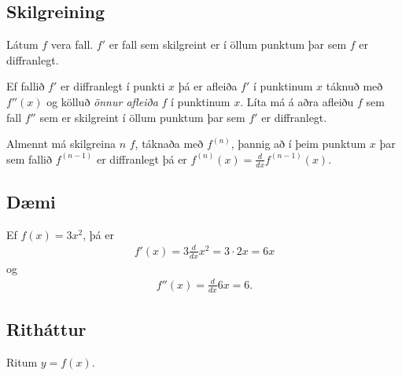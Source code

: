 \documentclass[a4paper,10pt,icelandic]{sphinxmanual}
\begin{document}
\subsection{Skilgreining}
\label{\detokenize{kafli03:skilgreining}}
Látum \(f\) vera fall.  \(f'\) er fall sem skilgreint er
í öllum punktum þar sem \(f\) er diffranlegt.

Ef fallið \(f'\) er diffranlegt í punkti \(x\) þá er afleiða
\(f'\) í punktinum \(x\) táknuð með \(f''(x)\) og kölluð
\textit{önnur afleiða} \(f\) í punktinum \(x\). Líta má á aðra afleiðu
\(f\) sem fall \(f''\) sem er skilgreint í öllum punktum þar sem
\(f'\) er diffranlegt.

Almennt má skilgreina \(n\) \(f\), táknaða með
\(f^{(n)}\), þannig að í þeim punktum \(x\) þar sem fallið
\(f^{(n-1)}\) er diffranlegt þá er
\(f^{(n)}(x)=\frac{d}{dx}f^{(n-1)}(x)\).


\subsection{Dæmi}
\label{\detokenize{kafli03:id8}}
Ef \(f(x)  = 3x^2\), þá er
\begin{equation*}
\begin{split}f'(x) = 3\frac{d}{dx}x^2 = 3\cdot 2x = 6x\end{split}
\end{equation*}
og
\begin{equation*}
\begin{split}f''(x) = \frac{d}{dx} 6x = 6.\end{split}
\end{equation*}

\subsection{Ritháttur}
\label{\detokenize{kafli03:id9}}
Ritum \(y=f(x)\).
\end{document}
